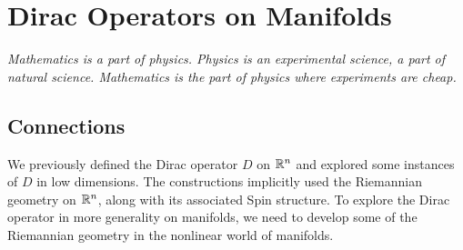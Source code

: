 \chapter{Dirac Operators on Manifolds}
%
\subsectionend $ $\\
%
\emph{Mathematics is a part of physics. Physics is an experimental science, a part of natural science. Mathematics is the part of physics where experiments are cheap.} \\
%
%
\subsectionend
%
\section{Connections}
%
We previously defined the Dirac operator $D$ on $\mathbb{R}^n$ and explored some
instances of $D$ in low dimensions. The constructions implicitly used the
Riemannian geometry on $\mathbb{R}^n$, along with its associated Spin structure.
To explore the Dirac operator in more generality on manifolds, we need to
develop some of the Riemannian geometry in the nonlinear world of manifolds.
%
